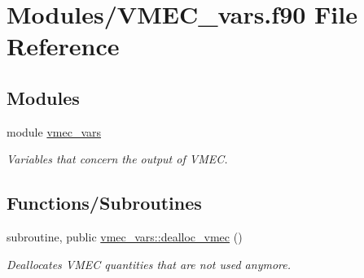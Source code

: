 \hypertarget{VMEC__vars_8f90}{}\section{Modules/\+V\+M\+E\+C\+\_\+vars.f90 File Reference}
\label{VMEC__vars_8f90}
\subsection*{Modules}
\begin{DoxyCompactItemize}
\item 
module \hyperlink{namespacevmec__vars}{vmec\+\_\+vars}
\begin{DoxyCompactList}\small\item\em Variables that concern the output of V\+M\+EC. \end{DoxyCompactList}\end{DoxyCompactItemize}
\subsection*{Functions/\+Subroutines}
\begin{DoxyCompactItemize}
\item 
subroutine, public \hyperlink{namespacevmec__vars_afe14ec328664d93b93c6dbda69df9175}{vmec\+\_\+vars\+::dealloc\+\_\+vmec} ()
\begin{DoxyCompactList}\small\item\em Deallocates V\+M\+EC quantities that are not used anymore. \end{DoxyCompactList}\end{DoxyCompactItemize}
